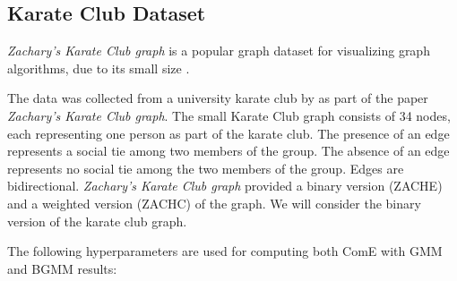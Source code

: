 \documentclass[conference]{IEEEtran}
\begin{document}
\subsection{Karate Club Dataset}
\label{sec:karate_club}

\textit{Zachary’s Karate Club graph} is a popular graph dataset for visualizing graph algorithms, due to its small size \cite{KarateClubDS}.

The data was collected from a university karate club by \citeauthor{Zachary1977AnIF} as part of the \citeyear{Zachary1977AnIF} paper \textit{Zachary’s Karate Club graph}. The small Karate Club graph consists of 34 nodes, each representing one person as part of the karate club. The presence of an edge represents a social tie among two members of the group. The absence of an edge represents no social tie among the two members of the group. Edges are bidirectional. \textit{Zachary’s Karate Club graph} provided a binary version (ZACHE) and a weighted version (ZACHC) of the graph. We will consider the binary version of the karate club graph.

The following hyperparameters are used for computing both ComE with GMM and BGMM results:
\end{document}
